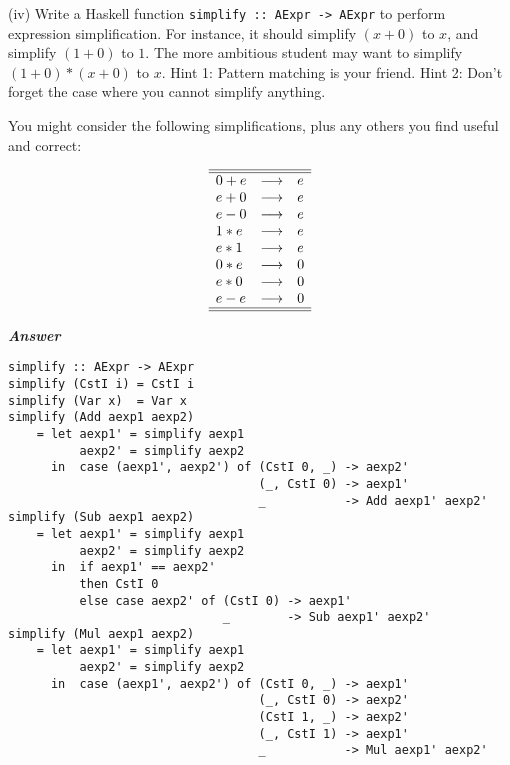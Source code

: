 \documentclass[a4paper]{article}
\begin{document}
\begin{exercise}
\noindent
(iv) Write a Haskell function \texttt{simplify ::\ AExpr -> AExpr} to
perform expression simplification.  For instance, it should simplify
$(x+0)$ to $x$, and simplify $(1+0)$ to $1$.  The more ambitious
student may want to simplify $(1+0)*(x+0)$ to $x$.  Hint 1: Pattern
matching is your friend.  Hint 2: Don't forget the case where you
cannot simplify anything.

You might consider the following simplifications, plus any others you
find useful and correct:

\begin{displaymath}
  \begin{array}{lcl}\hline\hline
    0 + e & \longrightarrow & e\\
    e + 0 & \longrightarrow & e\\
    e - 0 & \longrightarrow & e\\
    1 * e & \longrightarrow & e\\
    e * 1 & \longrightarrow & e\\
    0 * e & \longrightarrow & 0\\
    e * 0 & \longrightarrow & 0\\
    e - e & \longrightarrow & 0\\\hline\hline
  \end{array}
\end{displaymath}
  
\noindent
\textbf{\emph{Answer}}
{\codesetup\begin{verbatim}
simplify :: AExpr -> AExpr
simplify (CstI i) = CstI i
simplify (Var x)  = Var x
simplify (Add aexp1 aexp2) 
    = let aexp1' = simplify aexp1 
          aexp2' = simplify aexp2 
      in  case (aexp1', aexp2') of (CstI 0, _) -> aexp2' 
                                   (_, CstI 0) -> aexp1'
                                   _           -> Add aexp1' aexp2'
simplify (Sub aexp1 aexp2) 
    = let aexp1' = simplify aexp1 
          aexp2' = simplify aexp2 
      in  if aexp1' == aexp2' 
          then CstI 0 
          else case aexp2' of (CstI 0) -> aexp1' 
                              _        -> Sub aexp1' aexp2'
simplify (Mul aexp1 aexp2) 
    = let aexp1' = simplify aexp1 
          aexp2' = simplify aexp2 
      in  case (aexp1', aexp2') of (CstI 0, _) -> aexp1' 
                                   (_, CstI 0) -> aexp2'
                                   (CstI 1, _) -> aexp2'
                                   (_, CstI 1) -> aexp1'
                                   _           -> Mul aexp1' aexp2'
\end{verbatim}}\\


%
\end{exercise}
\end{document}
